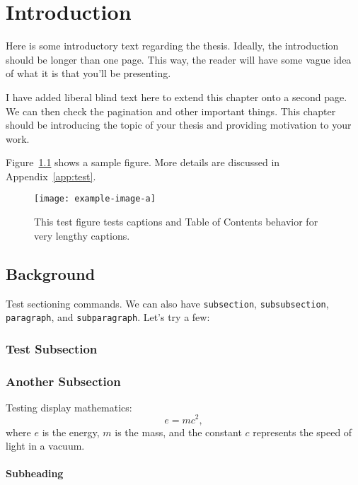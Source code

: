 \chapter{Introduction} \label{cha:intro}
Here is some introductory text regarding the thesis.
Ideally, the introduction should be longer than one page. 
This way, the reader will have some vague idea of what it is that you'll be presenting.

I have added liberal blind text here to extend this chapter onto a second page.  
We can then check the pagination and other important things. 
This chapter should be introducing the topic of your thesis and providing motivation to your work.

Figure~\ref{fig:test2} shows a sample figure. More details are discussed in Appendix~\ref{app:test}.
\begin{figure}
  \centering 
  \texttt{[image: example-image-a]}
  \caption{This test figure tests captions and Table of Contents 
    behavior for very lengthy captions.}
  \label{fig:test2}
\end{figure}

\section{Background}
Test sectioning commands.  We can also have \verb+subsection+, \verb+subsubsection+,
\verb+paragraph+, and \verb+subparagraph+.  Let's try a few:

\subsection{Test Subsection}
\lipsum[1]

\subsection{Another Subsection}
Testing display mathematics:
\begin{equation}
e = mc^2,
\end{equation}
where $e$ is the energy, $m$ is the mass, and the constant $c$ represents the speed of light in a vacuum.

\subsubsection{Subheading}
\lipsum[3-5]
